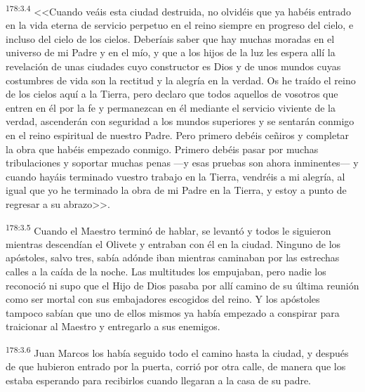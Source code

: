 \par 
\textsuperscript{178:3.4} <<Cuando veáis esta ciudad destruida, no olvidéis que ya habéis entrado en la vida eterna de servicio perpetuo en el reino siempre en progreso del cielo, e incluso del cielo de los cielos. Deberíais saber que hay muchas moradas en el universo de mi Padre y en el mío, y que a los hijos de la luz les espera allí la revelación de unas ciudades cuyo constructor es Dios y de unos mundos cuyas costumbres de vida son la rectitud y la alegría en la verdad. Os he traído el reino de los cielos aquí a la Tierra, pero declaro que todos aquellos de vosotros que entren en él por la fe y permanezcan en él mediante el servicio viviente de la verdad, ascenderán con seguridad a los mundos superiores y se sentarán conmigo en el reino espiritual de nuestro Padre. Pero primero debéis ceñiros y completar la obra que habéis empezado conmigo. Primero debéis pasar por muchas tribulaciones y soportar muchas penas ---y esas pruebas son ahora inminentes--- y cuando hayáis terminado vuestro trabajo en la Tierra, vendréis a mi alegría, al igual que yo he terminado la obra de mi Padre en la Tierra, y estoy a punto de regresar a su abrazo>>.

\par 
\textsuperscript{178:3.5} Cuando el Maestro terminó de hablar, se levantó y todos le siguieron mientras descendían el Olivete y entraban con él en la ciudad. Ninguno de los apóstoles, salvo tres, sabía adónde iban mientras caminaban por las estrechas calles a la caída de la noche. Las multitudes los empujaban, pero nadie los reconoció ni supo que el Hijo de Dios pasaba por allí camino de su última reunión como ser mortal con sus embajadores escogidos del reino. Y los apóstoles tampoco sabían que uno de ellos mismos ya había empezado a conspirar para traicionar al Maestro y entregarlo a sus enemigos.

\par 
\textsuperscript{178:3.6} Juan Marcos los había seguido todo el camino hasta la ciudad, y después de que hubieron entrado por la puerta, corrió por otra calle, de manera que los estaba esperando para recibirlos cuando llegaran a la casa de su padre.